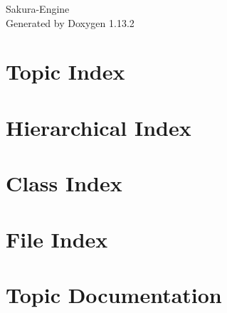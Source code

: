 \documentclass[twoside]{book}
\newcommand{\+}{\discretionary{\mbox{\scriptsize$\hookleftarrow$}}{}{}}
\newcommand{\clearemptydoublepage}{%
    \newpage{\pagestyle{empty}\cleardoublepage}%
  }
\begin{document}
  \raggedbottom
    \hypersetup{pageanchor=false,
                bookmarksnumbered=true,
                pdfencoding=unicode
               }
  \begin{titlepage}
  \vspace*{7cm}
  \begin{center}%
  {\Large Sakura-\/\+Engine}\\
  \vspace*{1cm}
  {\large Generated by Doxygen 1.13.2}\\
  \end{center}
  \end{titlepage}
  \clearemptydoublepage
  \tableofcontents
  \clearemptydoublepage
  \hypersetup{pageanchor=true}








\chapter{Topic Index}

\chapter{Hierarchical Index}

\chapter{Class Index}

\chapter{File Index}

\chapter{Topic Documentation}







\end{document}
